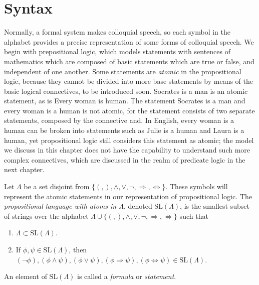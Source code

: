 \section{Syntax}

Normally, a formal system makes colloquial speech, so each symbol in the alphabet provides a precise representation of some forms of colloquial speech. We begin with prepositional logic, which models statements with sentences of mathematics which are composed of basic statements which are true or false, and independent of one another. Some statements are \emph{atomic} in the propositional logic, because they cannot be divided into more base statements by means of the basic logical connectives, to be introduced soon. \textsf{Socrates is a man} is an atomic statement, as is \textsf{Every woman is human}. The statement \textsf{Socrates is a man and every woman is a human} is not atomic, for the statement consists of two separate statements, composed by the connective \textsf{and}. In English, \textsf{every woman is a human} can be broken into statements such as \textsf{Julie is a human} and \textsf{Laura is a human}, yet propositional logic still considers this statement as atomic; the model we discuss in this chapter does not have the capability to understand such more complex connectives, which are discussed in the realm of predicate logic in the next chapter.

Let $\Lambda$ be a set disjoint from $\{ (, ), \wedge, \vee, \neg, \Rightarrow, \Leftrightarrow \}$. These symbols will represent the atomic statements in our representation of propositional logic. The \emph{propositional language with atoms in $\Lambda$}, denoted $\text{SL}(\Lambda)$, is the smallest subset of strings over the alphabet $\Lambda \cup \{ (, ), \wedge, \vee, \neg, \Rightarrow, \Leftrightarrow \}$ such that
%
\begin{enumerate}
    \item $\Lambda \subset \text{SL}(\Lambda)$.
    \item If $\phi, \psi \in \text{SL}(\Lambda)$, then $(\neg \phi), (\phi \wedge \psi), (\phi \vee \psi), (\phi \Rightarrow \psi), (\phi \Leftrightarrow \psi) \in \text{SL}(\Lambda)$.
\end{enumerate}
%
An element of $\text{SL}(\Lambda)$ is called a \emph{formula} or \emph{statement}.


